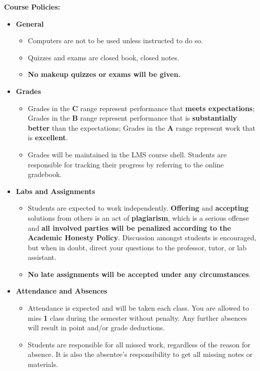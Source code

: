 \documentclass[11pt]{article}
\begin{document}
\textbf {\large Course Policies:}
\begin{itemize}
\item \textbf {General}
\begin{itemize}
\item Computers are not to be used unless instructed to do so.
\item Quizzes and exams are closed book, closed notes.
\item \textbf {No makeup quizzes or exams will be given.}
\end{itemize}
\item \textbf {Grades}
\begin{itemize}
\item Grades in the \textbf{C} range represent performance that \textbf{meets expectations}; Grades in the \textbf{B} range represent performance that is \textbf{substantially better} than the expectations; Grades in the \textbf{A} range represent work that is \textbf{excellent}.
\item Grades will be maintained in the LMS course shell. Students are responsible for tracking their progress by referring to the online gradebook.
\end{itemize}
\item \textbf {Labs and Assignments}
\begin{itemize}
\item Students are expected to work independently. \textbf{Offering} and \textbf{accepting} solutions from others is an act of \textbf{plagiarism}, which is a serious offense and \textbf{all involved parties will be penalized according to the Academic Honesty Policy}. Discussion amongst students is encouraged, but when in doubt, direct your questions to the professor, tutor, or lab assistant.
\item \textbf{No late assignments will be accepted under any circumstances}.
\end{itemize}
\item \textbf{Attendance and Absences}
\begin{itemize}
\item Attendance is expected and will be taken each class. You are allowed to miss \textbf{1} class during the semester without penalty. Any further absences will result in point and/or grade deductions. 
\item Students are responsible for all missed work, regardless of the reason for absence. It is also the absentee's responsibility to get all missing notes or materials. 
\end{itemize}
\end{itemize}
\end{document}
